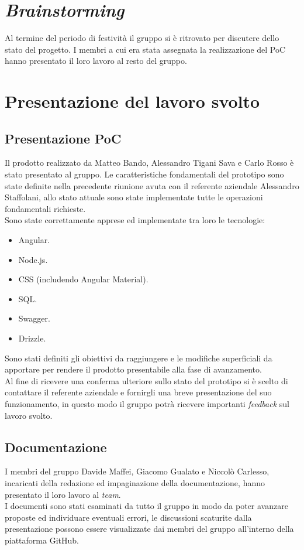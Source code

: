 \section{\textit{Brainstorming}}

Al termine del periodo di festività il gruppo si è ritrovato per discutere dello stato del progetto.
I membri a cui era stata assegnata la realizzazione del PoC hanno presentato il loro lavoro al resto del gruppo.

\section{Presentazione del lavoro svolto}
\subsection{Presentazione PoC}
Il prodotto realizzato da Matteo Bando, Alessandro Tigani Sava e Carlo Rosso è stato presentato al gruppo.
Le caratteristiche fondamentali del prototipo sono state definite nella precedente riunione avuta con il referente aziendale Alessandro Staffolani, allo stato attuale sono state implementate tutte le operazioni fondamentali richieste.\\
Sono state correttamente apprese ed implementate tra loro le tecnologie:
\begin{itemize}
	\item Angular.
	\item Node.js.
	\item CSS (includendo Angular Material).
	\item SQL.
	\item Swagger.
	\item Drizzle.
\end{itemize}
Sono stati definiti gli obiettivi da raggiungere e le modifiche superficiali da apportare per rendere il prodotto presentabile alla fase di avanzamento.\\
Al fine di ricevere una conferma ulteriore sullo stato del prototipo si è scelto di contattare il referente aziendale e fornirgli una breve presentazione del suo funzionamento, in questo modo il gruppo potrà ricevere importanti \textit{feedback} sul lavoro svolto.



\subsection{Documentazione}
I membri del gruppo Davide Maffei, Giacomo Gualato e Niccolò Carlesso, incaricati della redazione ed impaginazione della documentazione, hanno presentato il loro lavoro al \textit{team}.\\
I documenti sono stati esaminati da tutto il gruppo in modo da poter avanzare proposte ed individuare eventuali errori, le discussioni scaturite dalla presentazione possono essere visualizzate dai membri del gruppo all'interno della piattaforma GitHub.


